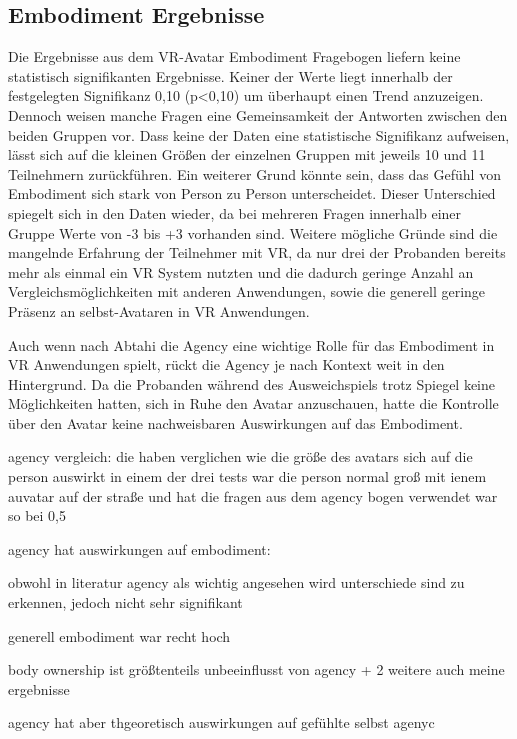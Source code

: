 \subsection{Embodiment Ergebnisse}
Die Ergebnisse aus dem VR-Avatar Embodiment Fragebogen liefern keine statistisch signifikanten Ergebnisse. Keiner der Werte liegt innerhalb der festgelegten Signifikanz 0,10 (p<0,10) um überhaupt einen Trend anzuzeigen. Dennoch weisen manche Fragen eine Gemeinsamkeit der Antworten zwischen den beiden Gruppen vor. Dass keine der Daten eine statistische Signifikanz aufweisen, lässt sich auf die kleinen Größen der einzelnen Gruppen mit jeweils 10 und 11 Teilnehmern zurückführen. Ein weiterer Grund könnte sein, dass das Gefühl von Embodiment sich stark von Person zu Person unterscheidet. Dieser Unterschied spiegelt sich in den Daten wieder, da bei mehreren Fragen innerhalb einer Gruppe Werte von -3 bis +3 vorhanden sind.
Weitere mögliche Gründe sind die mangelnde Erfahrung der Teilnehmer mit VR, da nur drei der Probanden bereits mehr als einmal ein VR System nutzten und die dadurch geringe Anzahl an Vergleichsmöglichkeiten mit anderen Anwendungen, sowie die generell geringe Präsenz an selbst-Avataren in VR Anwendungen.

Auch wenn nach Abtahi \cite{Abtahi2019} die Agency eine wichtige Rolle für das Embodiment in VR Anwendungen spielt, rückt die Agency je nach Kontext weit in den Hintergrund. Da die Probanden während des Ausweichspiels trotz Spiegel keine Möglichkeiten hatten, sich in Ruhe den Avatar anzuschauen, hatte die Kontrolle über den Avatar keine nachweisbaren Auswirkungen auf das Embodiment.


agency vergleich: \cite{Abtahi2019}
die haben verglichen wie die größe des avatars sich auf die person auswirkt
in einem der drei tests war die person normal groß mit ienem auvatar auf der straße und hat die fragen aus dem agency bogen verwendet
war so bei 0,5


agency hat auswirkungen auf embodiment: \cite{Koilias2019}

obwohl in literatur agency als wichtig angesehen wird
unterschiede sind zu erkennen, jedoch nicht sehr signifikant

generell embodiment war recht hoch




body ownership ist größtenteils unbeeinflusst von agency \cite{Koilias2019} + 2 weitere
auch meine ergebnisse

agency hat aber thgeoretisch auswirkungen auf gefühlte selbst agenyc

